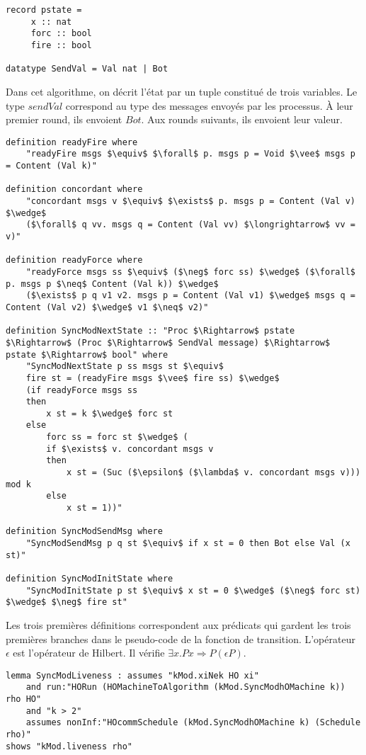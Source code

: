 \documentclass{article}
\begin{document}
\begin{lstlisting}
record pstate = 
     x :: nat
     forc :: bool
     fire :: bool
    
datatype SendVal = Val nat | Bot
\end{lstlisting}

Dans cet algorithme, on décrit l'état par un tuple constitué de trois variables.
Le type $sendVal$ correspond au type des messages envoyés par les processus.
À leur premier round, ils envoient	 $Bot$. Aux rounds suivants, ils envoient leur valeur.

\begin{lstlisting}[mathescape=true]
definition readyFire where
	"readyFire msgs $\equiv$ $\forall$ p. msgs p = Void $\vee$ msgs p = Content (Val k)"

definition concordant where
	"concordant msgs v $\equiv$ $\exists$ p. msgs p = Content (Val v) $\wedge$
	($\forall$ q vv. msgs q = Content (Val vv) $\longrightarrow$ vv = v)"

definition readyForce where
	"readyForce msgs ss $\equiv$ ($\neg$ forc ss) $\wedge$ ($\forall$ p. msgs p $\neq$ Content (Val k)) $\wedge$ 
	($\exists$ p q v1 v2. msgs p = Content (Val v1) $\wedge$ msgs q = Content (Val v2) $\wedge$ v1 $\neq$ v2)"

definition SyncModNextState :: "Proc $\Rightarrow$ pstate $\Rightarrow$ (Proc $\Rightarrow$ SendVal message) $\Rightarrow$ pstate $\Rightarrow$ bool" where
	"SyncModNextState p ss msgs st $\equiv$
	fire st = (readyFire msgs $\vee$ fire ss) $\wedge$
	(if readyForce msgs ss
	then
		x st = k $\wedge$ forc st
	else
		forc ss = forc st $\wedge$ (
		if $\exists$ v. concordant msgs v
		then
			x st = (Suc ($\epsilon$ ($\lambda$ v. concordant msgs v))) mod k
		else
			x st = 1))"

definition SyncModSendMsg where
	"SyncModSendMsg p q st $\equiv$ if x st = 0 then Bot else Val (x st)"

definition SyncModInitState where 
	"SyncModInitState p st $\equiv$ x st = 0 $\wedge$ ($\neg$ forc st) $\wedge$ $\neg$ fire st"
\end{lstlisting}

Les trois premières définitions correspondent aux prédicats qui gardent les trois premières branches dans le pseudo-code de la fonction de transition.
L'opérateur $\epsilon$ est l'opérateur de Hilbert. Il vérifie $\exists x. P x \Rightarrow P (\epsilon P)$.

\begin{lstlisting}
lemma SyncModLiveness : assumes "kMod.xiNek HO xi"
	and run:"HORun (HOMachineToAlgorithm (kMod.SyncModhOMachine k)) rho HO"
	and "k > 2"
	assumes nonInf:"HOcommSchedule (kMod.SyncModhOMachine k) (Schedule rho)"
shows "kMod.liveness rho"
\end{lstlisting}
\end{document}
